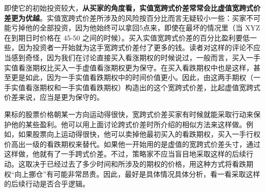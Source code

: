 即使它的初始投资较大，\textbf{从买家的角度看，实值宽跨式价差常常会比虚值宽跨式价差更为优越}。实值宽跨式价差所涉及的风险按百分比而言无疑较小一些：买家不可能亏掉他的全部投资，因为他始终可以拿回5点来，即使在最坏的情况里（当 XYZ 在到期日时价格在 45-50 之间的时候）。买入实值宽跨式价差的百分比盈利要低一些，因为投资者一开始就为这手宽跨式价差付了更多的钱。读者对这样的评论不应当感到奇怪，因为我们在讨论直接买入看涨期权的时候说过，一般而言，买入一手实值看涨期权比买入一手虚值看涨期权更为保守。在买入看跌期权中也是这样，甚至更是如此，因为一手实值看跌期权中的时间价值更小。因此，由这两手期权（一手实值看涨期权和一手实值看跌期权）构造出的这个宽跨式价差，比起虚值宽跨式价差来说，应当是更为保守的。

果标的股票价格朝某一方向运动得很快，宽跨式价差买家有时候就能采取行动来保护他的某些盈利。他可以用上面讨论跨式价差时所介绍的相似方法来这样做。例如，如果股票向上运动得很快，他可以卖掉他最初买入的看跌期权，买入一手行权价高出一级的看跌期权来替代。如果他一开始用的是虚值的宽跨式价差头寸，通过这样做，他就有了一手跨式价差。不过，策略家不应当盲目地采取这样的后续行动。这取决于已经过去了多少时间和所涉及的期权的价格，用这种方式将看跌期权“向上挪仓”有可能非常昂贵。因此，最好是具体情况具体分析，看一看采取这样的后续行动是否合乎逻辑。